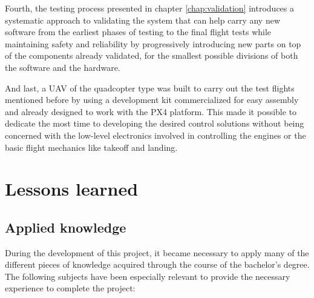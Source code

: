 Fourth, the testing process presented in chapter \ref{chap:validation} introduces a systematic approach to validating the system that can help carry any new software from the earliest phases of testing to the final flight tests while maintaining safety and reliability by progressively introducing new parts on top of the components already validated, for the smallest possible divisions of both the software and the hardware.

And last, a UAV of the quadcopter type was built to carry out the test flights mentioned before by using a development kit commercialized for easy assembly and already designed to work with the PX4 platform.
This made it possible to dedicate the most time to developing the desired control solutions without being concerned with the low-level electronics involved in controlling the engines or the basic flight mechanics like takeoff and landing.


\section{Lessons learned}
\label{sec:lessons-learned}

\subsection{Applied knowledge}

During the development of this project, it became necessary to apply many of the different pieces of knowledge acquired through the course of the bachelor's degree.
The following subjects have been especially relevant to provide the necessary experience to complete the project:

